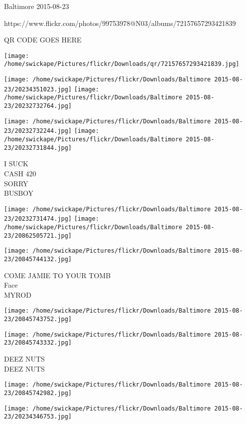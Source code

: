 \documentclass[10pt,letterpaper]{article}
\begin{document}
Baltimore 2015-08-23

https://www.flickr.com/photos/99753978@N03/albums/72157657293421839

QR CODE GOES HERE

\texttt{[image: /home/swickape/Pictures/flickr/Downloads/qr/72157657293421839.jpg]}
\pagebreak

\texttt{[image: /home/swickape/Pictures/flickr/Downloads/Baltimore 2015-08-23/20234351023.jpg]}
\texttt{[image: /home/swickape/Pictures/flickr/Downloads/Baltimore 2015-08-23/20232732764.jpg]}

\texttt{[image: /home/swickape/Pictures/flickr/Downloads/Baltimore 2015-08-23/20232732244.jpg]}
\texttt{[image: /home/swickape/Pictures/flickr/Downloads/Baltimore 2015-08-23/20232731844.jpg]}

I SUCK\\
CASH 420\\
SORRY\\
BUSBOY\\
\pagebreak

\texttt{[image: /home/swickape/Pictures/flickr/Downloads/Baltimore 2015-08-23/20232731474.jpg]}
\texttt{[image: /home/swickape/Pictures/flickr/Downloads/Baltimore 2015-08-23/20862505721.jpg]}

\texttt{[image: /home/swickape/Pictures/flickr/Downloads/Baltimore 2015-08-23/20845744132.jpg]}

COME JAMIE TO YOUR TOMB\\
Face\\
MYROD\\
\pagebreak

\texttt{[image: /home/swickape/Pictures/flickr/Downloads/Baltimore 2015-08-23/20845743752.jpg]}

\vspace{0.25in}
\texttt{[image: /home/swickape/Pictures/flickr/Downloads/Baltimore 2015-08-23/20845743332.jpg]}

DEEZ NUTS\\
DEEZ NUTS\\
\pagebreak

\texttt{[image: /home/swickape/Pictures/flickr/Downloads/Baltimore 2015-08-23/20845742982.jpg]}

\vspace{0.25in}
\texttt{[image: /home/swickape/Pictures/flickr/Downloads/Baltimore 2015-08-23/20234346753.jpg]}
\end{document}

